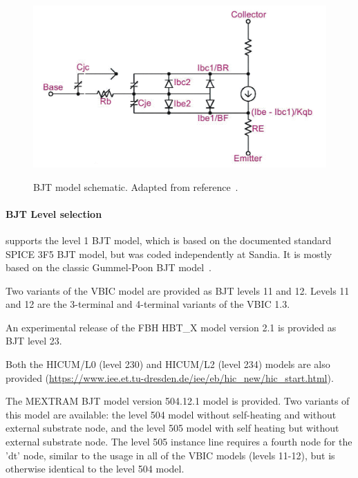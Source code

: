 \begin{figure}[ht]
  \centering
  \scalebox{0.6}
  {\includegraphics{bjtSchematic}}
  \caption[BJT model schematic]{BJT model schematic.  Adapted from
reference~\cite{PSpiceUG:1998}. \label{figBJTschematic}}
\end{figure}

\paragraph{BJT Level selection}

\Xyce{} supports the level 1 BJT model, which is based on the
documented standard SPICE 3F5 BJT model, but was coded independently
at Sandia.  It is mostly based on the classic Gummel-Poon BJT
model~\cite{GummelPoon}.

Two variants of the VBIC model are provided as BJT levels 11  and 12.
Levels 11 and 12 are the
3-terminal and 4-terminal variants of the VBIC 1.3.

An experimental release of the FBH HBT\_X model version
2.1\cite{Rudolph_documentationof} is provided as BJT level 23.

Both the HICUM/L0 (level 230) and HICUM/L2 (level 234) models are also
provided (\url{https://www.iee.et.tu-dresden.de/iee/eb/hic_new/hic_start.html}).

The MEXTRAM\cite{MEXTRAM_home} BJT model version 504.12.1 model is provided.
Two variants of this model are available: the level 504 model without
self-heating and without external substrate node, and the level 505 model with
self heating but without external substrate node.  The level 505 instance line
requires a fourth node for the 'dt' node, similar to the usage in all of the
VBIC models (levels 11-12), but is otherwise identical to the level 504 model.

